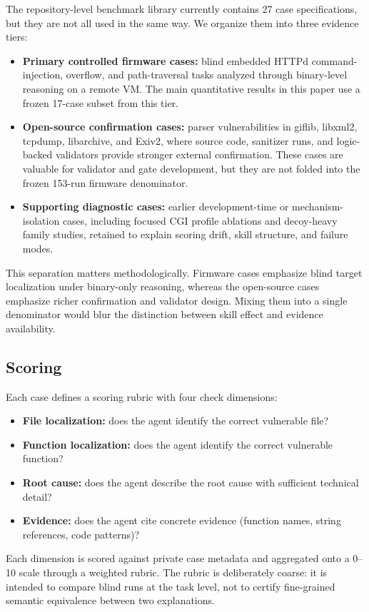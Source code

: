 ﻿\documentclass[preprint,12pt]{elsarticle}
\begin{document}
The repository-level benchmark library currently contains 27 case
specifications, but they are not all used in the same way.  We organize
them into three evidence tiers:
\begin{itemize}[leftmargin=*]
    \item \textbf{Primary controlled firmware cases:} blind embedded HTTPd
    command-injection, overflow, and path-traversal tasks analyzed through
    binary-level reasoning on a remote VM.  The main quantitative results
    in this paper use a frozen 17-case subset from this tier.
    \item \textbf{Open-source confirmation cases:} parser vulnerabilities
    in giflib, libxml2, tcpdump, libarchive, and Exiv2, where source code,
    sanitizer runs, and logic-backed validators provide stronger external
    confirmation.  These cases are valuable for validator and gate
    development, but they are not folded into the frozen 153-run firmware
    denominator.
    \item \textbf{Supporting diagnostic cases:} earlier development-time
    or mechanism-isolation cases, including focused CGI profile ablations
    and decoy-heavy family studies, retained to explain scoring drift,
    skill structure, and failure modes.
\end{itemize}

This separation matters methodologically.  Firmware cases emphasize blind
target localization under binary-only reasoning, whereas the open-source
cases emphasize richer confirmation and validator design.  Mixing them into
a single denominator would blur the distinction between skill effect and
evidence availability.

\subsection{Scoring}

Each case defines a scoring rubric with four check dimensions:
\begin{itemize}[leftmargin=*]
    \item \textbf{File localization:} does the agent identify the correct
    vulnerable file?
    \item \textbf{Function localization:} does the agent identify the
    correct vulnerable function?
    \item \textbf{Root cause:} does the agent describe the root cause with
    sufficient technical detail?
    \item \textbf{Evidence:} does the agent cite concrete evidence
    (function names, string references, code patterns)?
\end{itemize}
Each dimension is scored against private case metadata and aggregated onto a
0--10 scale through a weighted rubric.  The rubric is deliberately coarse:
it is intended to compare blind runs at the task level, not to certify
fine-grained semantic equivalence between two explanations.
\end{document}
